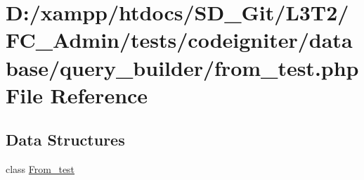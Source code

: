 \hypertarget{_admin_2tests_2codeigniter_2database_2query__builder_2from__test_8php}{}\section{D\+:/xampp/htdocs/\+S\+D\+\_\+\+Git/\+L3\+T2/\+F\+C\+\_\+\+Admin/tests/codeigniter/database/query\+\_\+builder/from\+\_\+test.php File Reference}
\label{_admin_2tests_2codeigniter_2database_2query__builder_2from__test_8php}
\subsection*{Data Structures}
\begin{DoxyCompactItemize}
\item 
class \hyperlink{class_from__test}{From\+\_\+test}
\end{DoxyCompactItemize}
